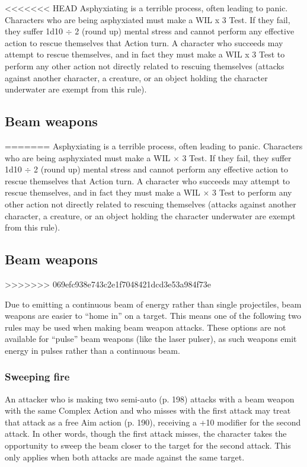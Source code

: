 <<<<<<< HEAD
Asphyxiating is a terrible process, often leading to panic. Characters who are being asphyxiated must make a WIL x 3 Test. If they fail, they suffer 1d10 $\div$ 2 (round up) mental stress and cannot perform any effective action to rescue themselves that Action turn. A character who succeeds may attempt to rescue themselves, and in fact they must make a WIL x 3 Test to perform any other action not directly related to rescuing themselves (attacks against another character, a creature, or an object holding the character underwater are exempt from this rule).


\subsection{Beam weapons}
\label{sec:beam-weapons}
=======
Asphyxiating is a terrible process, often leading to panic. Characters who are being asphyxiated must make a WIL $\times$ 3 Test. If they fail, they suffer 1d10 $\div$ 2 (round up) mental stress and cannot perform any effective action to rescue themselves that Action turn. A character who succeeds may attempt to rescue themselves, and in fact they must make a WIL $\times$ 3 Test to perform any other action not directly related to rescuing themselves (attacks against another character, a creature, or an object holding the character underwater are exempt from this rule).


\subsection{Beam weapons}
\label{sec:combat-beam-weapons}
>>>>>>> 069efc938e743c2e1f7048421dcd3e53a984f73e

Due to emitting a continuous beam of energy rather than single projectiles, beam weapons are easier to ``home in'' on a target. This means one of the following two rules may be used when making beam weapon attacks. These options are not available for ``pulse'' beam weapons (like the laser pulser), as such weapons emit energy in pulses rather than a continuous beam.

\subsubsection{Sweeping fire}

An attacker who is making two semi-auto (p. 198) attacks with a beam weapon with the same Complex Action and who misses with the first attack may treat that attack as a free Aim action (p. 190), receiving a +10 modifier for the second attack. In other words, though the first attack misses, the character takes the opportunity to sweep the beam closer to the target for the second attack. This only applies when both attacks are made against the same target.

